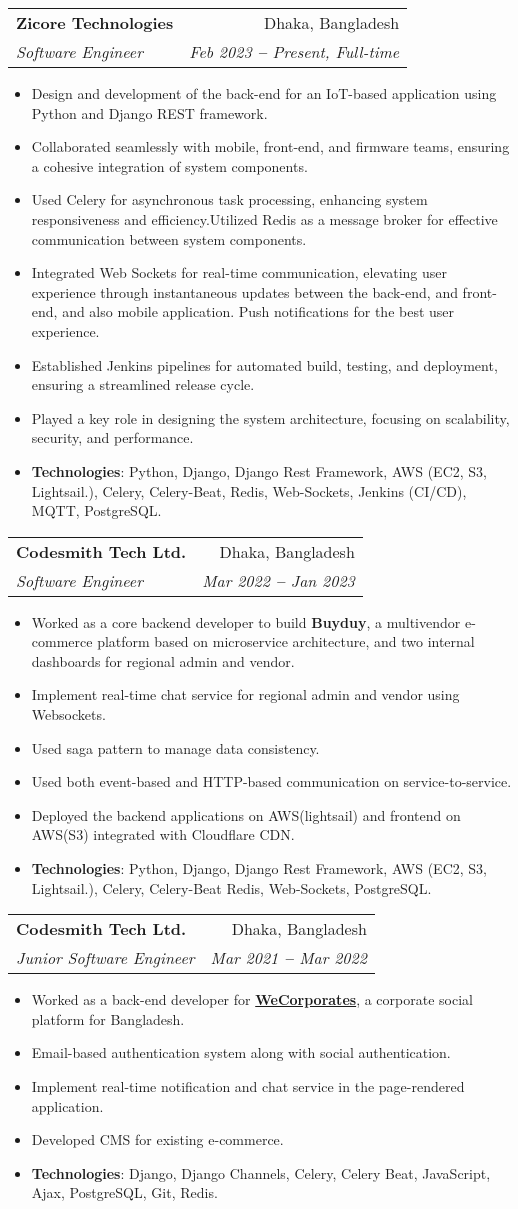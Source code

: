\documentclass[letterpaper,11pt]{article}
\makeatletter
\newcommand{\resumeItem}[1]{
  \item\small{
    {#1 \vspace{-2pt}}
  }
}
\newcommand{\resumeSubheading}[4]{
  \vspace{-2pt}\item
    \begin{tabular*}{0.97\textwidth}[t]{l@{\extracolsep{\fill}}r}
      \textbf{#1} & #2 \\
      \textit{\small#3} & \textit{\small #4} \\
    \end{tabular*}\vspace{-7pt}
}
\newcommand{\resumeItemListStart}{\begin{itemize}}
\newcommand{\resumeItemListEnd}{\end{itemize}\vspace{-5pt}}
\makeatother
\begin{document}
    \resumeSubheading
      {Zicore Technologies}{Dhaka, Bangladesh}
      {Software Engineer}{Feb 2023 \textbf{--} Present, Full-time}
        \resumeItemListStart
            \resumeItem{Design and development of the back-end for an IoT-based application using Python and Django REST framework.}
            \resumeItem{Collaborated seamlessly with mobile, front-end, and firmware teams, ensuring a cohesive integration of system components.}
            \resumeItem{Used Celery for asynchronous task processing, enhancing system responsiveness and efficiency.Utilized Redis as a message broker for effective communication between system components.}
            \resumeItem{Integrated Web Sockets for real-time communication, elevating user experience through instantaneous updates between the back-end, and front-end, and also mobile application. Push notifications for the best user experience.}
            \resumeItem{Established Jenkins pipelines for automated build, testing, and deployment, ensuring a streamlined release cycle.}
            \resumeItem{Played a key role in designing the system architecture, focusing on scalability, security, and performance.}
            \resumeItem{\textbf{Technologies}: Python, Django, Django Rest Framework, AWS (EC2, S3, Lightsail.), Celery, Celery-Beat, Redis, Web-Sockets, Jenkins (CI/CD), MQTT, PostgreSQL.}
        \resumeItemListEnd

    \resumeSubheading
      {Codesmith Tech Ltd.}{Dhaka, Bangladesh}
      {Software Engineer}{Mar 2022 \textbf{--} Jan 2023}
        \resumeItemListStart
            \resumeItem{Worked as a core backend developer to build \textbf{Buyduy}, a multivendor e-commerce platform based on microservice architecture, and two internal dashboards for regional admin and vendor.}
            \resumeItem{Implement real-time chat service for regional admin and vendor using Websockets.}
            \resumeItem{Used saga pattern to manage data consistency.}
            \resumeItem{Used both event-based and HTTP-based communication on service-to-service.}
            \resumeItem{Deployed the backend applications on AWS(lightsail) and frontend on AWS(S3) integrated with Cloudflare CDN.}
            \resumeItem{\textbf{Technologies}: Python, Django, Django Rest Framework, AWS (EC2, S3, Lightsail.), Celery, Celery-Beat Redis, Web-Sockets, PostgreSQL.}
        \resumeItemListEnd

    \resumeSubheading
      {Codesmith Tech Ltd.}{Dhaka, Bangladesh}
      {Junior Software Engineer}{Mar 2021 \textbf{--} Mar 2022}
        \resumeItemListStart
            \resumeItem{Worked as a back-end developer for  \textbf{\href{https://wecorporates.com/}{WeCorporates}}, a corporate social platform for Bangladesh.}
            \resumeItem{Email-based authentication system along with social authentication.}
            \resumeItem{Implement real-time notification and chat service in the page-rendered application.}
            \resumeItem{Developed CMS for existing e-commerce.}
            \resumeItem{\textbf{Technologies}: Django, Django Channels, Celery, Celery Beat, JavaScript, Ajax, PostgreSQL, Git, Redis.}
        \resumeItemListEnd
    
\end{document}
